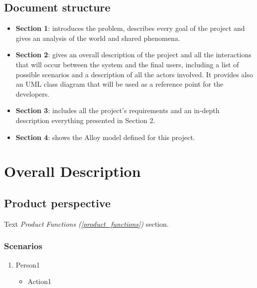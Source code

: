 \documentclass[table, 12pt]{article} %
\begin{document}
    \subsection{Document structure}
        \begin{itemize}
            \item \textbf{Section 1}: introduces the problem, describes every goal of the project and gives an analysis of the world and shared phenomena.
            \item \textbf{Section 2}: gives an overall description of the project and all the interactions that will occur between the system and the final users, including a list of possible scenarios and a description of all the actors involved. It provides also an UML class diagram that will be used as a reference point for the developers.
            \item \textbf{Section 3}: includes all the project's requirements and an in-depth description everything presented in Section 2.
            \item \textbf{Section 4}: shows the Alloy model defined for this project.
        \end{itemize}

    \newpage






    \section{Overall Description}

    \subsection{Product perspective}
    Text \textit{Product Functions (\ref{product_functions})} section.

        \subsubsection{Scenarios}
        \label{scenarios}
            \begin{enumerate}

            \item Person1 
            \begin{itemize}
                \item Action1
            \end{itemize}

        
        \end{enumerate}
\end{document}
